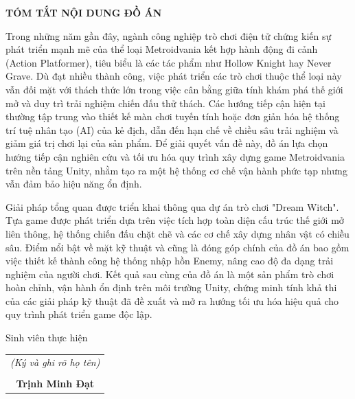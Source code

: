 \documentclass[../DoAn.tex]{subfiles}
\begin{document}
\begin{center}
    \Large{\textbf{TÓM TẮT NỘI DUNG ĐỒ ÁN}}\\
\end{center}
\vspace{1cm}

Trong những năm gần đây, ngành công nghiệp trò chơi điện tử chứng kiến sự phát triển mạnh mẽ của thể loại Metroidvania kết hợp hành động đi cảnh (Action Platformer), tiêu biểu là các tác phẩm như Hollow Knight hay Never Grave. Dù đạt nhiều thành công, việc phát triển các trò chơi thuộc thể loại này vẫn đối mặt với thách thức lớn trong việc cân bằng giữa tính khám phá thế giới mở và duy trì trải nghiệm chiến đấu thử thách. Các hướng tiếp cận hiện tại thường tập trung vào thiết kế màn chơi tuyến tính hoặc đơn giản hóa hệ thống trí tuệ nhân tạo (AI) của kẻ địch, dẫn đến hạn chế về chiều sâu trải nghiệm và giảm giá trị chơi lại của sản phẩm. Để giải quyết vấn đề này, đồ án lựa chọn hướng tiếp cận nghiên cứu và tối ưu hóa quy trình xây dựng game Metroidvania trên nền tảng Unity, nhằm tạo ra một hệ thống cơ chế vận hành phức tạp nhưng vẫn đảm bảo hiệu năng ổn định. 

Giải pháp tổng quan được triển khai thông qua dự án trò chơi "Dream Witch". Tựa game được phát triển dựa trên việc tích hợp toàn diện cấu trúc thế giới mở liên thông, hệ thống chiến đấu chặt chẽ và các cơ chế xây dựng nhân vật có chiều sâu. Điểm nổi bật về mặt kỹ thuật và cũng là đóng góp chính của đồ án bao gồm việc thiết kế thành công hệ thống nhập hồn Enemy, nâng cao độ đa dạng trải nghiệm của người chơi. Kết quả sau cùng của đồ án là một sản phẩm trò chơi hoàn chỉnh, vận hành ổn định trên môi trường Unity, chứng minh tính khả thi của các giải pháp kỹ thuật đã đề xuất và mở ra hướng tối ưu hóa hiệu quả cho quy trình phát triển game độc lập.

\begin{flushright}
Sinh viên thực hiện\\
\vspace{1.5cm} %
\begin{tabular}{@{}c@{}}
\textit{(Ký và ghi rõ họ tên)}\\
\vspace{0.4cm}\\
\textbf{Trịnh Minh Đạt}
\end{tabular}
\end{flushright}
\end{document}
